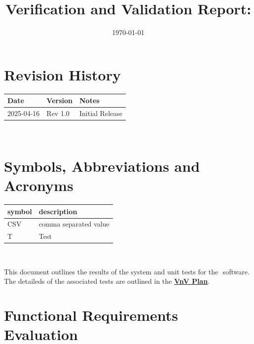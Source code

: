 \documentclass[12pt, titlepage]{article}
\begin{document}
\title{Verification and Validation Report: \progname} 
\author{\authname}
\date{\today}
	
\maketitle


\section{Revision History}

\begin{tabularx}{\textwidth}{p{3cm}p{2cm}X}
\toprule {\bf Date} & {\bf Version} & {\bf Notes}\\
\midrule
2025-04-16 & Rev 1.0 & Initial Release\\
\bottomrule
\end{tabularx}

~\newpage

\section{Symbols, Abbreviations and Acronyms}

\renewcommand{\arraystretch}{1.2}
\begin{tabular}{l l} 
  \toprule		
  \textbf{symbol} & \textbf{description}\\
  \midrule 
  CSV & comma separated value \\
  T & Test\\
  \bottomrule
\end{tabular}\\


\newpage

\tableofcontents

\listoftables %

\listoffigures %

\newpage


This document outlines the results of the system and unit tests for the \progname  $ $ software. The detaileds of the associated tests are outlined in the \href{https://github.com/KiranSingh15/CAS-741-Image-Correspondences/blob/main/docs/VnVPlan/VnVPlan.pdf}{\textbf{VnV Plan}}.
\section{Functional Requirements Evaluation}
\end{document}
